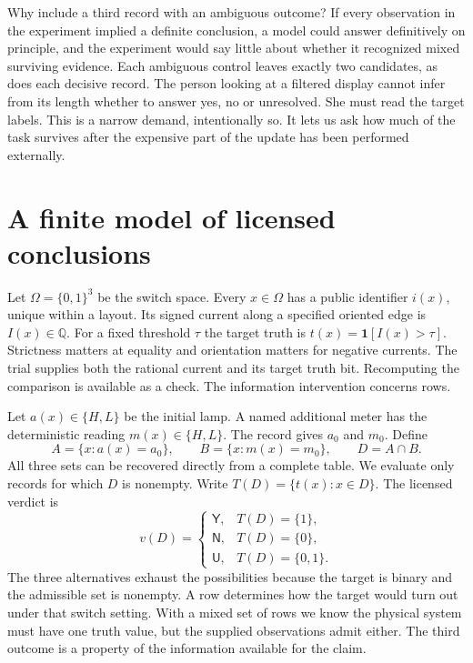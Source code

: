 \documentclass[12pt,letterpaper]{article}
\newcommand{\yes}{\mathsf Y}\newcommand{\no}{\mathsf N}\newcommand{\unk}{\mathsf U}
\begin{document}
Why include a third record with an ambiguous outcome? If every observation in the experiment implied a definite conclusion, a model could answer definitively on principle, and the experiment would say little about whether it recognized mixed surviving evidence. Each ambiguous control leaves exactly two candidates, as does each decisive record. The person looking at a filtered display cannot infer from its length whether to answer yes, no or unresolved. She must read the target labels. This is a narrow demand, intentionally so. It lets us ask how much of the task survives after the expensive part of the update has been performed externally.

\section{A finite model of licensed conclusions}

Let $\Omega=\{0,1\}^3$ be the switch space. Every $x\in\Omega$ has a public identifier $i(x)$, unique within a layout. Its signed current along a specified oriented edge is $I(x)\in\mathbb Q$. For a fixed threshold $\tau$ the target truth is $t(x)=\mathbf 1[I(x)>\tau]$. Strictness matters at equality and orientation matters for negative currents. The trial supplies both the rational current and its target truth bit. Recomputing the comparison is available as a check. The information intervention concerns rows.

Let $a(x)\in\{H,L\}$ be the initial lamp. A named additional meter has the deterministic reading $m(x)\in\{H,L\}$. The record gives $a_0$ and $m_0$. Define
\begin{equation}
 A=\{x:a(x)=a_0\},\qquad B=\{x:m(x)=m_0\},\qquad D=A\cap B.
 \label{eq:intersection}
\end{equation}
All three sets can be recovered directly from a complete table. We evaluate only records for which $D$ is nonempty. Write $T(D)=\{t(x):x\in D\}$. The licensed verdict is
\[
 v(D)=
 \begin{cases}
 \yes, & T(D)=\{1\},\\
 \no, & T(D)=\{0\},\\
 \unk, & T(D)=\{0,1\}.
 \end{cases}
\]
The three alternatives exhaust the possibilities because the target is binary and the admissible set is nonempty. A row determines how the target would turn out under that switch setting. With a mixed set of rows we know the physical system must have one truth value, but the supplied observations admit either. The third outcome is a property of the information available for the claim.
\end{document}
